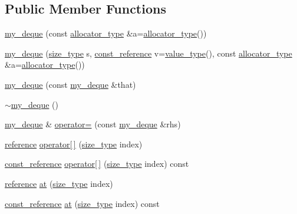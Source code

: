 \subsection*{Public Member Functions}
\begin{DoxyCompactItemize}
\item 
\hyperlink{classmy__deque_ad2ac9d80048c55fcc045d2861c73aa1a}{my\-\_\-deque} (const \hyperlink{classmy__deque_a34236f0fef930decd11dc683f40a38be}{allocator\-\_\-type} \&a=\hyperlink{classmy__deque_a34236f0fef930decd11dc683f40a38be}{allocator\-\_\-type}())
\item 
\hyperlink{classmy__deque_aeaf4c625438497a7cd6a670da6c2c08b}{my\-\_\-deque} (\hyperlink{classmy__deque_a61e5e5317fe72a381ce4d45f09544b02}{size\-\_\-type} s, \hyperlink{classmy__deque_ad50d8b378580088cf77fa43f0640e49c}{const\-\_\-reference} v=\hyperlink{classmy__deque_ae9c156c405acc57623a4601ce755596f}{value\-\_\-type}(), const \hyperlink{classmy__deque_a34236f0fef930decd11dc683f40a38be}{allocator\-\_\-type} \&a=\hyperlink{classmy__deque_a34236f0fef930decd11dc683f40a38be}{allocator\-\_\-type}())
\item 
\hyperlink{classmy__deque_a59015bc46e6096555d631d69dc8fd7e7}{my\-\_\-deque} (const \hyperlink{classmy__deque}{my\-\_\-deque} \&that)
\item 
\hyperlink{classmy__deque_ae22194ee436865a59a7475c339a9c1ca}{$\sim$my\-\_\-deque} ()
\item 
\hyperlink{classmy__deque}{my\-\_\-deque} \& \hyperlink{classmy__deque_aaa103f2058854bb98e500de6305b1564}{operator=} (const \hyperlink{classmy__deque}{my\-\_\-deque} \&rhs)
\item 
\hyperlink{classmy__deque_a4c34c14f397b7676445b37c87003116b}{reference} \hyperlink{classmy__deque_a489b77decf4d424f43092e194d69444f}{operator\mbox{[}$\,$\mbox{]}} (\hyperlink{classmy__deque_a61e5e5317fe72a381ce4d45f09544b02}{size\-\_\-type} index)
\item 
\hyperlink{classmy__deque_ad50d8b378580088cf77fa43f0640e49c}{const\-\_\-reference} \hyperlink{classmy__deque_ad79fcd9e94dfc5566e1cd0ce606cf208}{operator\mbox{[}$\,$\mbox{]}} (\hyperlink{classmy__deque_a61e5e5317fe72a381ce4d45f09544b02}{size\-\_\-type} index) const 
\item 
\hyperlink{classmy__deque_a4c34c14f397b7676445b37c87003116b}{reference} \hyperlink{classmy__deque_a75106748e6ff8735e40560e7335bd500}{at} (\hyperlink{classmy__deque_a61e5e5317fe72a381ce4d45f09544b02}{size\-\_\-type} index)
\item 
\hyperlink{classmy__deque_ad50d8b378580088cf77fa43f0640e49c}{const\-\_\-reference} \hyperlink{classmy__deque_a9642816a10e6a6ee1f8a5367987b8ee8}{at} (\hyperlink{classmy__deque_a61e5e5317fe72a381ce4d45f09544b02}{size\-\_\-type} index) const 

\end{DoxyCompactItemize}
